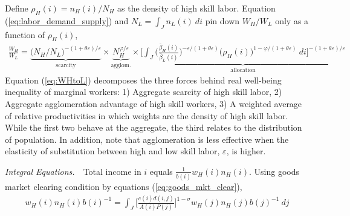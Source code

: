 \documentclass{article}
\begin{document}
Define $\rho_H(i) = n_H(i)/N_H$ as the density of high skill labor. Equation (\ref{eq:labor_demand_supply}) and $ N_L = \int_J n_L(i)~di $ pin down $W_H/W_L$ only as a function of $\rho_H(i)$,
\begin{eqnarray}\label{eq:WHtoL}
\frac{W_H}{W_L} =
\underbrace{\Big(N_H/N_L\Big)^{-(1+\theta \varepsilon)/\varepsilon}}_{\mbox{scarcity}} \times \underbrace{N_H^{\varphi/\varepsilon}}_{\mbox{agglom.}} 
\times
\underbrace{\Bigg[ \int_J \Big(  \frac{\bar{\beta}_H(i)}{\bar{\beta}_L(i)} \Big)^{-\varepsilon/(1+\theta \varepsilon)} \Big( \rho_H(i) \Big)^{1-\varphi/(1+\theta \varepsilon)}~di \Bigg]^{-(1+\theta \varepsilon)/\varepsilon}}_{\mbox{allocation}} 
\end{eqnarray}
Equation (\ref{eq:WHtoL}) decomposes the three forces behind real well-being inequality of marginal workers: 1) Aggregate scarcity of high skill labor, 2) Aggregate agglomeration advantage of high skill workers, 3) A weighted average of relative productivities in which weights are the density of high skill labor. While the  first two behave at the aggregate, the third relates to the distribution of population. In addition, note that agglomeration is less effective when the elasticity of substitution between high and low skill labor, $\varepsilon$, is higher.

\textit{Integral Equations.}~~Total income in $i$ equals
$\frac{1}{b(i)} w_H(i)n_H(i)$. Using goods market clearing condition by equations (\ref{eq:goods_mkt_clear}), 
\begin{eqnarray}
	w_H(i) n_H(i) b(i)^{-1} = 
	\int_J \Big[ \frac{c(i) d(i,j)}{A(i) P(j)} \Big]^{1-\sigma} w_H(j) n_H(j) b(j)^{-1} ~dj \nonumber
\end{eqnarray}
\end{document}
